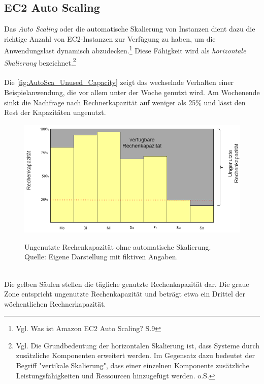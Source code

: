 \subsection{EC2 Auto Scaling}
Das \textit{Auto Scaling} oder die automatische Skalierung von Instanzen dient dazu die richtige Anzahl von EC2-Instanzen zur Verfügung zu haben, um die Anwendungslast dynamisch abzudecken.\footnote{Vgl. Was ist Amazon EC2 Auto Scaling? S.9\cite{AMZ31}} Diese Fähigkeit wird als \textit{horizontale Skalierung} bezeichnet.\footnote{Vgl. Die Grundbedeutung der horizontalen Skalierung ist, dass Systeme durch zusätzliche Komponenten erweitert werden. Im Gegensatz dazu bedeutet der Begriff "vertikale Skalierung", dass einer einzelnen Komponente zusätzliche Leistungsfähigkeiten und Ressourcen hinzugefügt werden. o.S.\cite{TECH1} }
\\\\
Die \autoref{fig:AutoSca_Unused_Capacity} zeigt das wechselnde Verhalten einer Beispielanwendung, die vor allem unter der Woche genutzt wird. Am Wochenende sinkt die Nachfrage nach Rechnerkapazität auf weniger als 25\% und lässt den Rest der Kapazitäten ungenutzt. 
\begin{figure}[h]
    \centering
    \includegraphics[scale=0.5]{sources/AutoCap Unused Capacity}
    \caption[Ungenutzte Rechenkapazität ohne automatische Skalierung]{}
    \label{fig:AutoSca_Unused_Capacity} Ungenutzte Rechenkapazität ohne automatische Skalierung. \\
    Quelle: Eigene Darstellung mit fiktiven Angaben. 
  \end{figure}\\
Die gelben Säulen stellen die tägliche genutzte Rechenkapazität dar.
Die graue Zone entspricht ungenutzte Rechenkapazität und beträgt etwa ein Drittel der wöchentlichen Rechnerkapazität.

